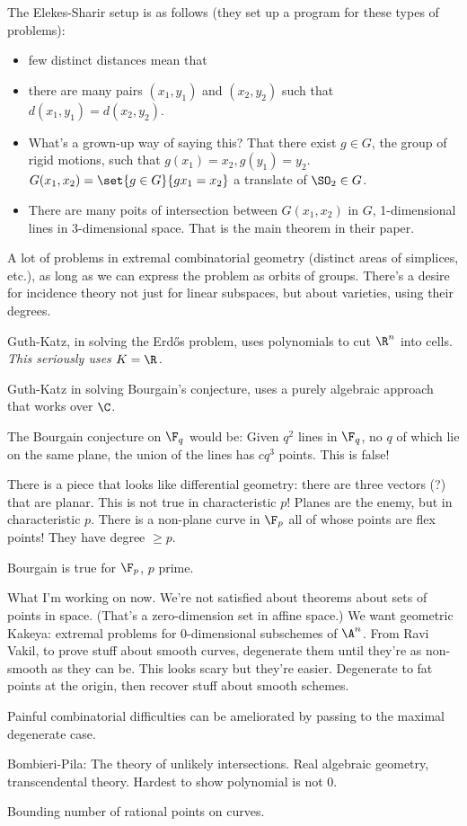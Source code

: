 The Elekes-Sharir setup is as follows (they set up a program for these types of problems): 
\begin{itemize}
\item
few distinct distances mean that 
\item there are many pairs $(x_1,y_1)$ and $(x_2,y_2)$ such that $d(x_1,y_1)=d(x_2,y_2)$.
\item What's a grown-up way of saying this? That there exist $g\in G$, the group of rigid motions, such that $g(x_1)=x_2, g(y_1)=y_2$. 
$G(x_1,x_2)=\set{g\in G}{gx_1=x_2}$ a translate of $\SO_2\in G$.
\item 
There are many poits of intersection between $G(x_1,x_2)$ in $G$, 1-dimensional lines in 3-dimensional space. That is the main theorem in their paper.
\end{itemize}
A lot of problems in extremal combinatorial geometry (distinct areas of simplices, etc.), as long as we can express the problem as orbits of groups.
There's a desire for incidence theory not just for linear subspaces, but about varieties, using their degrees.

Guth-Katz, in solving the Erd\H os problem, uses polynomials to cut $\R^n$ into cells. {\it This seriously uses $K=\R$.}

Guth-Katz in solving Bourgain's conjecture, uses a purely algebraic approach that works over $\C$.

The Bourgain conjecture on $\F_q$ would be: Given $q^2$ lines in $\F_q$, no $q$ of which lie on the same plane, the union of the lines has $cq^3$ points. This is false!

There is a piece that looks like differential geometry: there are three vectors (?) that are planar. This is not true in characteristic $p$! Planes are the enemy, but in characteristic $p$. 
There is a non-plane curve in $\F_p$ all of whose points are flex points! They have degree $\ge p$. 
\begin{thm}
Bourgain is true for $\F_p$, $p$ prime.
\end{thm}

What I'm working on now. We're not satisfied about theorems about sets of points in space. (That's a zero-dimension set in affine space.) We want geometric Kakeya: extremal problems for 0-dimensional subschemes of $\A^n$. 
From Ravi Vakil, to prove stuff about smooth curves, degenerate them until they're as non-smooth as they can be. This looks scary but they're easier. 
Degenerate to fat points at the origin, then recover stuff about smooth schemes. 

Painful combinatorial difficulties can be ameliorated by passing to the maximal degenerate case.

Bombieri-Pila: The theory of unlikely intersections. Real algebraic geometry, transcendental theory. Hardest to show polynomial is not 0.

Bounding number of rational points on curves. %
